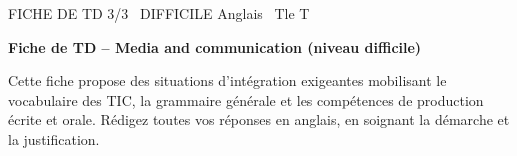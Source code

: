 \documentclass[11pt]{article}
\begin{document}
\begin{tcolorbox}[enhanced,colback=popink,colframe=popink,arc=10pt,boxrule=0pt,left=12pt,right=12pt,top=9pt,bottom=9pt]
{\color{white}\popxbold\small FICHE DE TD 3/3 \textbullet\ DIFFICILE \hfill Anglais \textbullet\ Tle T\par}
\end{tcolorbox}
\vspace{4pt}
\textbf{Fiche de TD -- Media and communication (niveau difficile)}

Cette fiche propose des situations d'intégration exigeantes mobilisant le vocabulaire des TIC, la grammaire générale et les compétences de production écrite et orale. Rédigez toutes vos réponses en anglais, en soignant la démarche et la justification.
\end{document}
